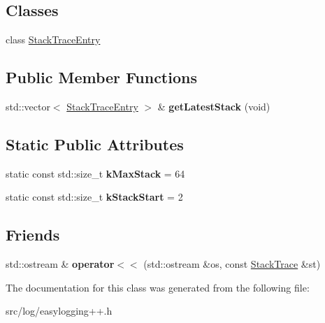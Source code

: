 \subsection*{Classes}
\begin{DoxyCompactItemize}
\item 
class \hyperlink{classel_1_1base_1_1debug_1_1StackTrace_1_1StackTraceEntry}{Stack\+Trace\+Entry}
\end{DoxyCompactItemize}
\subsection*{Public Member Functions}
\begin{DoxyCompactItemize}
\item 
std\+::vector$<$ \hyperlink{classel_1_1base_1_1debug_1_1StackTrace_1_1StackTraceEntry}{Stack\+Trace\+Entry} $>$ \& {\bfseries get\+Latest\+Stack} (void)\hypertarget{classel_1_1base_1_1debug_1_1StackTrace_a8b6a4f154b59d597b73fe8a515df3240}{}\label{classel_1_1base_1_1debug_1_1StackTrace_a8b6a4f154b59d597b73fe8a515df3240}

\end{DoxyCompactItemize}
\subsection*{Static Public Attributes}
\begin{DoxyCompactItemize}
\item 
static const std\+::size\+\_\+t {\bfseries k\+Max\+Stack} = 64\hypertarget{classel_1_1base_1_1debug_1_1StackTrace_a6e3db7fdc258a7d653f00fc5aade55c2}{}\label{classel_1_1base_1_1debug_1_1StackTrace_a6e3db7fdc258a7d653f00fc5aade55c2}

\item 
static const std\+::size\+\_\+t {\bfseries k\+Stack\+Start} = 2\hypertarget{classel_1_1base_1_1debug_1_1StackTrace_ab8a89fe5c4f779d3e685a5e61f1136e2}{}\label{classel_1_1base_1_1debug_1_1StackTrace_ab8a89fe5c4f779d3e685a5e61f1136e2}

\end{DoxyCompactItemize}
\subsection*{Friends}
\begin{DoxyCompactItemize}
\item 
std\+::ostream \& {\bfseries operator$<$$<$} (std\+::ostream \&os, const \hyperlink{classel_1_1base_1_1debug_1_1StackTrace}{Stack\+Trace} \&st)\hypertarget{classel_1_1base_1_1debug_1_1StackTrace_a3b8e978df331fbe725e2a39d031355cc}{}\label{classel_1_1base_1_1debug_1_1StackTrace_a3b8e978df331fbe725e2a39d031355cc}

\end{DoxyCompactItemize}


The documentation for this class was generated from the following file\+:\begin{DoxyCompactItemize}
\item 
src/log/easylogging++.\+h\end{DoxyCompactItemize}
